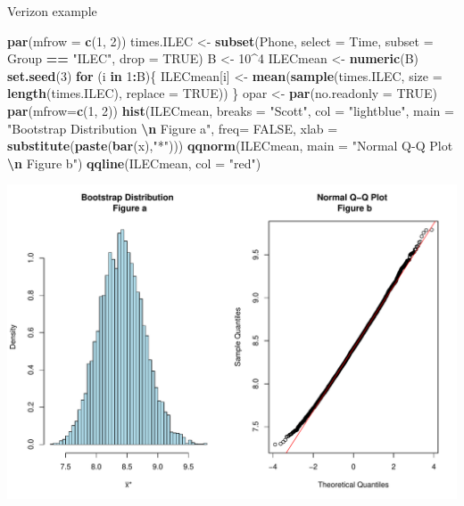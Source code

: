 \documentclass[
  ignorenonframetext,
]{beamer}
\newenvironment{Shaded}{\begin{snugshade}}{\end{snugshade}}
\newcommand{\AttributeTok}[1]{\textcolor[rgb]{0.13,0.29,0.53}{#1}}
\newcommand{\ConstantTok}[1]{\textcolor[rgb]{0.56,0.35,0.01}{#1}}
\newcommand{\ControlFlowTok}[1]{\textcolor[rgb]{0.13,0.29,0.53}{\textbf{#1}}}
\newcommand{\DecValTok}[1]{\textcolor[rgb]{0.00,0.00,0.81}{#1}}
\newcommand{\FunctionTok}[1]{\textcolor[rgb]{0.13,0.29,0.53}{\textbf{#1}}}
\newcommand{\NormalTok}[1]{#1}
\newcommand{\OtherTok}[1]{\textcolor[rgb]{0.56,0.35,0.01}{#1}}
\newcommand{\SpecialCharTok}[1]{\textcolor[rgb]{0.81,0.36,0.00}{\textbf{#1}}}
\newcommand{\StringTok}[1]{\textcolor[rgb]{0.31,0.60,0.02}{#1}}
\begin{document}
\begin{frame}[fragile]{Verizon example}
\protect\hypertarget{verizon-example-2}{}
\tiny

\begin{Shaded}
\begin{Highlighting}[]
\FunctionTok{par}\NormalTok{(}\AttributeTok{mfrow =} \FunctionTok{c}\NormalTok{(}\DecValTok{1}\NormalTok{, }\DecValTok{2}\NormalTok{))}
\NormalTok{times.ILEC }\OtherTok{\textless{}{-}} \FunctionTok{subset}\NormalTok{(Phone, }\AttributeTok{select =}\NormalTok{ Time, }\AttributeTok{subset =}\NormalTok{ Group }\SpecialCharTok{==} \StringTok{"ILEC"}\NormalTok{, }\AttributeTok{drop =} \ConstantTok{TRUE}\NormalTok{)}
\NormalTok{B }\OtherTok{\textless{}{-}} \DecValTok{10}\SpecialCharTok{\^{}}\DecValTok{4}
\NormalTok{ILECmean }\OtherTok{\textless{}{-}} \FunctionTok{numeric}\NormalTok{(B)}
\FunctionTok{set.seed}\NormalTok{(}\DecValTok{3}\NormalTok{)}
\ControlFlowTok{for}\NormalTok{ (i }\ControlFlowTok{in} \DecValTok{1}\SpecialCharTok{:}\NormalTok{B)\{}
\NormalTok{ ILECmean[i] }\OtherTok{\textless{}{-}} \FunctionTok{mean}\NormalTok{(}\FunctionTok{sample}\NormalTok{(times.ILEC, }\AttributeTok{size =} \FunctionTok{length}\NormalTok{(times.ILEC), }\AttributeTok{replace =} \ConstantTok{TRUE}\NormalTok{)) }
\NormalTok{\}}
\NormalTok{opar }\OtherTok{\textless{}{-}} \FunctionTok{par}\NormalTok{(}\AttributeTok{no.readonly =} \ConstantTok{TRUE}\NormalTok{)}
\FunctionTok{par}\NormalTok{(}\AttributeTok{mfrow=}\FunctionTok{c}\NormalTok{(}\DecValTok{1}\NormalTok{, }\DecValTok{2}\NormalTok{))}
\FunctionTok{hist}\NormalTok{(ILECmean, }\AttributeTok{breaks =} \StringTok{"Scott"}\NormalTok{, }\AttributeTok{col =} \StringTok{"lightblue"}\NormalTok{, }
     \AttributeTok{main =} \StringTok{"Bootstrap Distribution }\SpecialCharTok{\textbackslash{}n}\StringTok{ Figure a"}\NormalTok{, }
     \AttributeTok{freq=} \ConstantTok{FALSE}\NormalTok{, }\AttributeTok{xlab =} \FunctionTok{substitute}\NormalTok{(}\FunctionTok{paste}\NormalTok{(}\FunctionTok{bar}\NormalTok{(x),}\StringTok{"*"}\NormalTok{)))}
\FunctionTok{qqnorm}\NormalTok{(ILECmean, }\AttributeTok{main =} \StringTok{"Normal Q{-}Q Plot }\SpecialCharTok{\textbackslash{}n}\StringTok{ Figure b"}\NormalTok{)}
\FunctionTok{qqline}\NormalTok{(ILECmean, }\AttributeTok{col =} \StringTok{"red"}\NormalTok{)}
\end{Highlighting}
\end{Shaded}

\begin{center}\includegraphics[width=0.6\linewidth,height=0.4\textheight]{Week10_Lect_files/figure-beamer/unnamed-chunk-32-1} \end{center}
\normalsize
\end{frame}
\end{document}
